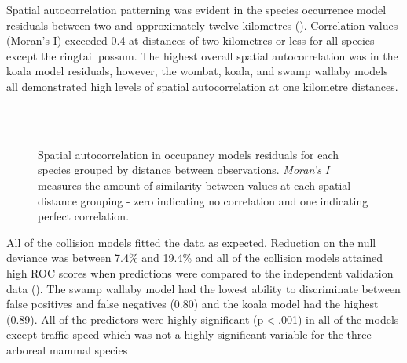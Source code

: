 Spatial autocorrelation patterning was evident in the species occurrence model residuals between two and approximately twelve kilometres (). Correlation values (Moran's I) exceeded 0.4 at distances of two kilometres or less for all species except the ringtail possum. The highest overall spatial autocorrelation was in the koala model residuals, however, the wombat, koala, and swamp wallaby models all demonstrated high levels of spatial autocorrelation at one kilometre distances.

\begin{figure*}[!t]
  \centering
  \\
  \\
  \caption[Spatial autocorrelation in occupancy models residuals for six mammal species]{Spatial autocorrelation in occupancy models residuals for each species grouped by distance between observations. \textit{Moran's I} measures the amount of similarity between values at each spatial distance grouping - zero indicating no correlation and one indicating perfect correlation.}
  \label{6sp_sac}
\end{figure*}

All of the collision models fitted the data as expected.  Reduction on the null deviance was between 7.4\% and 19.4\% and all of the collision models attained high ROC scores when predictions were compared to the independent validation data ().  The swamp wallaby model had the lowest ability to discriminate between false positives and false negatives (0.80) and the koala model had the highest (0.89). All of the predictors were highly significant (p$<$.001) in all of the models except traffic speed which was not a highly significant variable for the three arboreal mammal species

